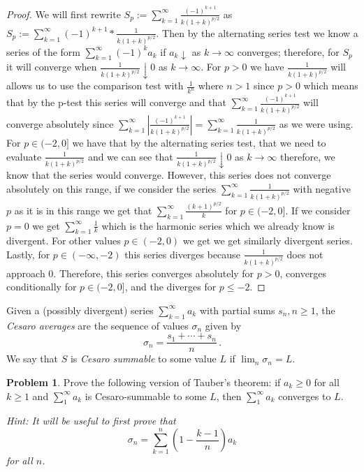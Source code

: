 \documentclass[11pt]{article}
\theoremstyle{definition}
\newtheorem{problem}{Problem}
\begin{document}
\begin{proof}
We will first rewrite $S_p := \sum_{k = 1}^\infty \frac{(-1)^{k + 1} }{k (1 + k)^{p/2}}$ as $S_p := \sum_{k = 1}^\infty (-1)^{k+1} * \frac{1}{k(1+k)^{p/2}}.$ Then by the alternating series test we know a series of the form $\sum_{k=1}^\infty (-1)^ka_k$ if $a_k \downarrow$ as $k\rightarrow \infty$ converges; therefore, for $S_p$ it will converge when $\frac{1}{k(1+k)^{p/2}} \downarrow 0$ as $k\rightarrow \infty$. For $p > 0$ we have $\frac{1}{k(1+k)^{p/2}}$ will allows us to use the comparison test with $\frac{1}{k^n}$ where $n > 1$ since $p > 0$ which means that by the p-test this series will converge and that $\sum_{k = 1}^\infty \frac{(-1)^{k + 1} }{k (1 + k)^{p/2}}$ will converge absolutely since $\sum_{k = 1}^\infty |\frac{(-1)^{k + 1} }{k (1 + k)^{p/2}}| = \sum_{k = 1}^\infty \frac{1}{k (1 + k)^{p/2}}$ as we were using. For $p \in (-2, 0]$ we have that by the alternating series test, that we need to evaluate $\frac{1}{k(1+k)^{p/2}}$ and we can see that $\frac{1}{k(1+k)^{p/2}} \downarrow 0$ as $k\to \infty$ therefore, we know that the series would converge. However, this series does not converge absolutely on this range, if we consider the series $\sum_{k = 1}^\infty \frac{1}{k (1 + k)^{p/2}}$ with negative $p$ as it is in this range we get that $\sum_{k = 1}^\infty \frac{(k+1)^{p/2}}{k}$ for $p\in (-2, 0]$. If we consider $p=0$ we get $\sum_{k = 1}^\infty \frac{1}{k}$ which is the harmonic series which we already know is divergent. For other values $p\in (-2, 0)$ we get we get similarly divergent series. Lastly, for $p \in (-\infty, -2)$ this series diverges because $\frac{1}{k(1+k)^{p/2}}$ does not approach 0. Therefore, this series converges absolutely for $p > 0$, converges conditionally for $p\in (-2, 0]$, and the diverges for $p \leq -2$.
\end{proof}

\pagebreak
Given a (possibly divergent) 
series $\sum_{k = 1}^\infty a_k$ with partial sums $s_n, n \geq 1$,  
the \emph{Cesaro averages} are the sequence of values $\sigma_n$ given
by 
\[
\sigma_n = \frac{s_1 + \cdots + s_n}{n} \,. 
\]
We say that $S$ is \emph{Cesaro summable} to some value $L$ if 
$\lim_n \sigma_n = L$. 
\begin{problem}
Prove the following version of Tauber's theorem: if $a_k \geq 0$ for all $k \geq 1$ and $\sum_1^\infty a_k$ is Cesaro-summable to some $L$, then $\sum_1^\infty a_k$ converges to $L$. 

{\it Hint: It will be useful to first prove that 
\[
\sigma_n = \sum_{k = 1}^{n} \left( 1 - \frac{k-1}{n} \right) a_k
\]
for all $n$.}
\end{problem}
\end{document}
